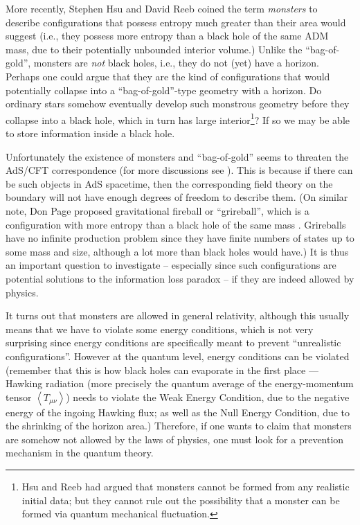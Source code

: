 \documentclass[12pt]{article}
\newcommand{\2}{$^2$}
\newcommand{\3}{$^3$}
\newcommand{\4}{$_4$}
\newcommand{\5}{$_5$}
\begin{document}
More recently, Stephen Hsu and David Reeb \cite{hsu1, hsu2} coined the term \emph{monsters} to describe configurations that possess entropy much greater than their area would suggest (i.e., they possess more entropy than a black hole of the same ADM mass, due to their potentially unbounded interior volume.) Unlike the ``bag-of-gold'', monsters are \emph{not} black holes, i.e., they do not (yet) have a horizon. Perhaps one could argue that they are the kind of configurations that would potentially collapse into a ``bag-of-gold''-type geometry with a horizon. Do ordinary stars somehow eventually develop such monstrous geometry before they collapse into a black hole, which in turn has large interior\footnote{Hsu and Reeb had argued that monsters cannot be formed from any realistic initial data; but they cannot rule out the possibility that a monster can be formed via quantum mechanical fluctuation.}? If so we may be able to store information inside a black hole.

Unfortunately the existence of monsters and ``bag-of-gold'' seems to threaten the AdS/CFT correspondence (for more discussions see \cite{marolf}). This is because if there can be such objects in AdS spacetime, then the corresponding field theory on the boundary will not have enough degrees of freedom to describe them. (On similar note, Don Page proposed gravitational fireball or ``grireball'', which is a configuration with more entropy than a black hole of the same mass \cite{grireball}. {\color{black}Grireballs have no infinite production problem since they have finite numbers of states up to some mass and size, although a lot more than black holes would have.}) It is thus an important question to investigate -- especially since such configurations are potential solutions to the information loss paradox  -- if they are indeed allowed by physics. 

It turns out that monsters are allowed in general relativity, although this usually means that we have to violate some energy conditions, which is not very surprising since energy conditions are specifically meant to prevent ``unrealistic configurations''. However at the quantum level, energy conditions can be violated (remember that this is how black holes can evaporate in the first place --- Hawking radiation (more precisely the quantum average of the energy-momentum tensor $\left\langle T_{\mu\nu}\right\rangle$) needs to violate the Weak Energy Condition, due to the negative energy of the ingoing Hawking flux; as well as the Null Energy Condition, due to the shrinking of the horizon area.) Therefore, if one wants to claim that monsters are somehow not allowed by the laws of physics, one must look for a prevention mechanism in the quantum theory.
\end{document}
